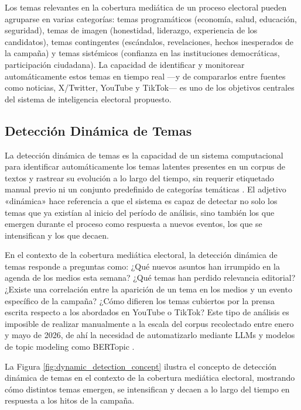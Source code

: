 Los temas relevantes en la cobertura mediática de un proceso electoral pueden agruparse en varias categorías: temas programáticos (economía, salud, educación, seguridad), temas de imagen (honestidad, liderazgo, experiencia de los candidatos), temas contingentes (escándalos, revelaciones, hechos inesperados de la campaña) y temas sistémicos (confianza en las instituciones democráticas, participación ciudadana). La capacidad de identificar y monitorear automáticamente estos temas en tiempo real —y de compararlos entre fuentes como noticias, X/Twitter, YouTube y TikTok— es uno de los objetivos centrales del sistema de inteligencia electoral propuesto.

\subsection{Detección Dinámica de Temas}

La detección dinámica de temas es la capacidad de un sistema computacional para identificar automáticamente los temas latentes presentes en un corpus de textos y rastrear su evolución a lo largo del tiempo, sin requerir etiquetado manual previo ni un conjunto predefinido de categorías temáticas \parencite{tec_grootendorst2022bertopic}. El adjetivo «dinámica» hace referencia a que el sistema es capaz de detectar no solo los temas que ya existían al inicio del período de análisis, sino también los que emergen durante el proceso como respuesta a nuevos eventos, los que se intensifican y los que decaen.

En el contexto de la cobertura mediática electoral, la detección dinámica de temas responde a preguntas como: ¿Qué nuevos asuntos han irrumpido en la agenda de los medios esta semana? ¿Qué temas han perdido relevancia editorial? ¿Existe una correlación entre la aparición de un tema en los medios y un evento específico de la campaña? ¿Cómo difieren los temas cubiertos por la prensa escrita respecto a los abordados en YouTube o TikTok? Este tipo de análisis es imposible de realizar manualmente a la escala del corpus recolectado entre enero y mayo de 2026, de ahí la necesidad de automatizarlo mediante LLMs y modelos de topic modeling como BERTopic \parencite{tec_grootendorst2022bertopic}.

La Figura \ref{fig:dynamic_detection_concept} ilustra el concepto de detección dinámica de temas en el contexto de la cobertura mediática electoral, mostrando cómo distintos temas emergen, se intensifican y decaen a lo largo del tiempo en respuesta a los hitos de la campaña.

